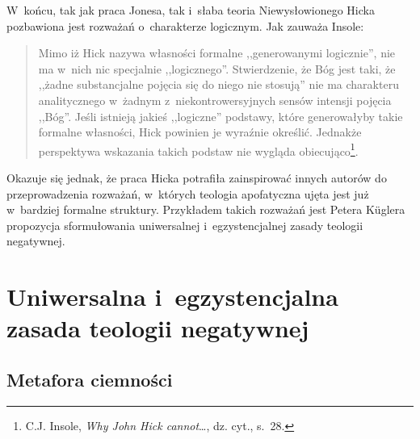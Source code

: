 W~końcu, tak jak praca Jonesa, tak i~słaba teoria Niewysłowionego Hicka pozbawiona jest rozważań o~charakterze logicznym. Jak zauważa Insole:

\begin{quote}
Mimo iż Hick nazywa własności formalne ,,generowanymi logicznie'', nie ma w~nich nic specjalnie ,,logicznego''. Stwierdzenie, że Bóg jest taki, że ,,żadne substancjalne pojęcia się do niego nie stosują'' nie ma charakteru analitycznego w~żadnym z~niekontrowersyjnych sensów intensji pojęcia ,,Bóg''. Jeśli istnieją jakieś ,,logiczne'' podstawy, które generowałyby takie formalne własności, Hick powinien je wyraźnie określić. Jednakże perspektywa wskazania takich podstaw nie wygląda obiecująco\footnote{C.J. Insole, \textit{Why John Hick cannot}\ldots, dz. cyt., s.~28.}.
\end{quote}
Okazuje się jednak, że praca Hicka potrafiła zainspirować innych autorów do przeprowadzenia rozważań, w~których teologia apofatyczna ujęta jest już w~bardziej formalne struktury. Przykładem takich rozważań jest Petera Küglera propozycja sformułowania uniwersalnej i~egzystencjalnej zasady teologii negatywnej.









\chapter{Uniwersalna i~egzystencjalna zasada teologii negatywnej}\label{sil-kugler}


\section{Metafora ciemności}

